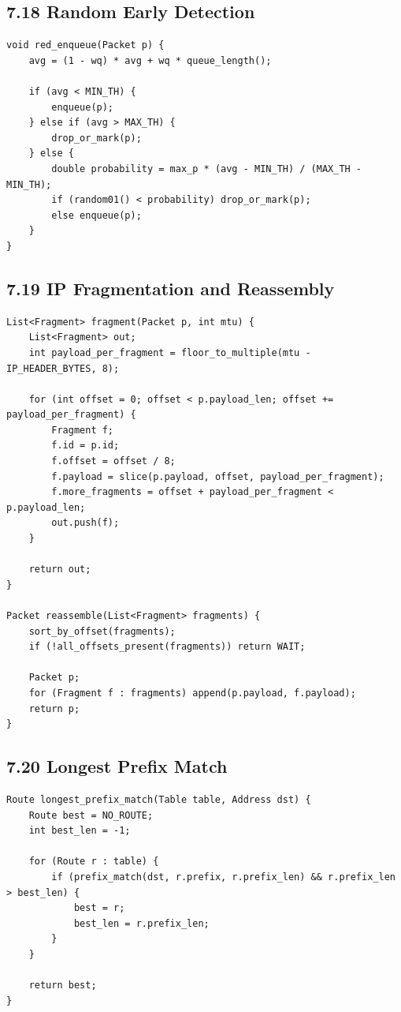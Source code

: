 \documentclass[11pt]{article}
\begin{document}
\subsection{7.18 Random Early Detection}\label{random-early-detection}

\begin{verbatim}
void red_enqueue(Packet p) {
    avg = (1 - wq) * avg + wq * queue_length();

    if (avg < MIN_TH) {
        enqueue(p);
    } else if (avg > MAX_TH) {
        drop_or_mark(p);
    } else {
        double probability = max_p * (avg - MIN_TH) / (MAX_TH - MIN_TH);
        if (random01() < probability) drop_or_mark(p);
        else enqueue(p);
    }
}
\end{verbatim}

\subsection{7.19 IP Fragmentation and
Reassembly}\label{ip-fragmentation-and-reassembly}

\begin{verbatim}
List<Fragment> fragment(Packet p, int mtu) {
    List<Fragment> out;
    int payload_per_fragment = floor_to_multiple(mtu - IP_HEADER_BYTES, 8);

    for (int offset = 0; offset < p.payload_len; offset += payload_per_fragment) {
        Fragment f;
        f.id = p.id;
        f.offset = offset / 8;
        f.payload = slice(p.payload, offset, payload_per_fragment);
        f.more_fragments = offset + payload_per_fragment < p.payload_len;
        out.push(f);
    }

    return out;
}

Packet reassemble(List<Fragment> fragments) {
    sort_by_offset(fragments);
    if (!all_offsets_present(fragments)) return WAIT;

    Packet p;
    for (Fragment f : fragments) append(p.payload, f.payload);
    return p;
}
\end{verbatim}

\subsection{7.20 Longest Prefix Match}\label{longest-prefix-match}

\begin{verbatim}
Route longest_prefix_match(Table table, Address dst) {
    Route best = NO_ROUTE;
    int best_len = -1;

    for (Route r : table) {
        if (prefix_match(dst, r.prefix, r.prefix_len) && r.prefix_len > best_len) {
            best = r;
            best_len = r.prefix_len;
        }
    }

    return best;
}
\end{verbatim}
\end{document}
